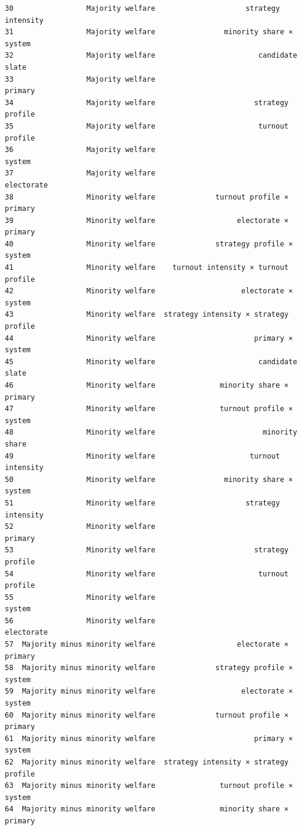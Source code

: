 \documentclass[11pt]{article}
\begin{document}
\begin{tcolorbox}[breakable, size=fbox, boxrule=.5pt, pad at break*=1mm, opacityfill=0]
\begin{Verbatim}[commandchars=\\\{\}]
30                 Majority welfare                     strategy intensity
31                 Majority welfare                minority share × system
32                 Majority welfare                        candidate slate
33                 Majority welfare                                primary
34                 Majority welfare                       strategy profile
35                 Majority welfare                        turnout profile
36                 Majority welfare                                 system
37                 Majority welfare                             electorate
38                 Minority welfare              turnout profile × primary
39                 Minority welfare                   electorate × primary
40                 Minority welfare              strategy profile × system
41                 Minority welfare    turnout intensity × turnout profile
42                 Minority welfare                    electorate × system
43                 Minority welfare  strategy intensity × strategy profile
44                 Minority welfare                       primary × system
45                 Minority welfare                        candidate slate
46                 Minority welfare               minority share × primary
47                 Minority welfare               turnout profile × system
48                 Minority welfare                         minority share
49                 Minority welfare                      turnout intensity
50                 Minority welfare                minority share × system
51                 Minority welfare                     strategy intensity
52                 Minority welfare                                primary
53                 Minority welfare                       strategy profile
54                 Minority welfare                        turnout profile
55                 Minority welfare                                 system
56                 Minority welfare                             electorate
57  Majority minus minority welfare                   electorate × primary
58  Majority minus minority welfare              strategy profile × system
59  Majority minus minority welfare                    electorate × system
60  Majority minus minority welfare              turnout profile × primary
61  Majority minus minority welfare                       primary × system
62  Majority minus minority welfare  strategy intensity × strategy profile
63  Majority minus minority welfare               turnout profile × system
64  Majority minus minority welfare               minority share × primary

\end{Verbatim}
\end{tcolorbox}
\end{document}
